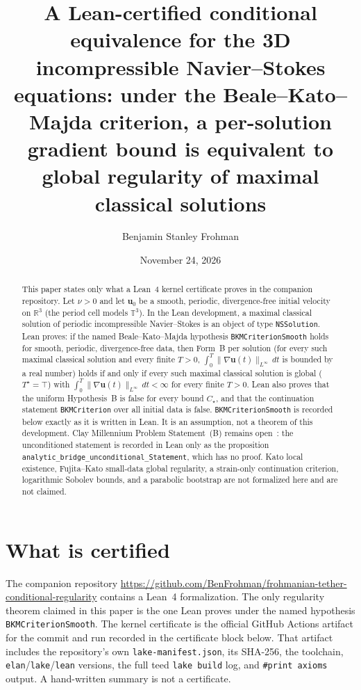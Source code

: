 \documentclass[11pt,reqno]{amsart}
\title[Lean-certified conditional equivalence for 3D Navier--Stokes]{A Lean-certified conditional equivalence for the 3D incompressible Navier--Stokes equations: under the Beale--Kato--Majda criterion, a per-solution gradient bound is equivalent to global regularity of maximal classical solutions}
\author{Benjamin Stanley Frohman}
\date{November 24, 2026}
\theoremstyle{definition}
\newcommand{\R}{\mathbb{R}}
\newcommand{\T}{\mathbb{T}}
\newcommand{\uvec}{\mathbf{u}}
\numberwithin{equation}{section}
\begin{document}
\begin{abstract}
This paper states only what a Lean~4 kernel certificate proves in the companion repository. Let \(\nu>0\) and let \(\uvec_0\) be a smooth, periodic, divergence-free initial velocity on \(\R^3\) (the period cell models \(\T^3\)). In the Lean development, a maximal classical solution of periodic incompressible Navier--Stokes is an object of type \texttt{NSSolution}. Lean proves: if the named Beale--Kato--Majda hypothesis \texttt{BKMCriterionSmooth} holds for smooth, periodic, divergence-free data, then Form~B per solution (for every such maximal classical solution and every finite \(T>0\), \(\int_0^T\|\nabla\uvec(t)\|_{L^\infty}\,dt\) is bounded by a real number) holds if and only if every such maximal classical solution is global (\(T^\star=\top\)) with \(\int_0^T\|\nabla\uvec(t)\|_{L^\infty}\,dt<\infty\) for every finite \(T>0\). Lean also proves that the uniform Hypothesis~B is false for every bound \(C_\star\), and that the continuation statement \texttt{BKMCriterion} over all initial data is false. \texttt{BKMCriterionSmooth} is recorded below exactly as it is written in Lean. It is an assumption, not a theorem of this development. Clay Millennium Problem Statement~(B) remains open~\cite{Fefferman2000}: the unconditioned statement is recorded in Lean only as the proposition \texttt{analytic\_bridge\_unconditional\_Statement}, which has no proof. Kato local existence, Fujita--Kato small-data global regularity, a strain-only continuation criterion, logarithmic Sobolev bounds, and a parabolic bootstrap are not formalized here and are not claimed.
\end{abstract}

\maketitle
{}\par\medskip

\section{What is certified}

The companion repository
\url{https://github.com/BenFrohman/frohmanian-tether-conditional-regularity}
contains a Lean~4 formalization. The only regularity theorem claimed in this paper is the one Lean proves under the named hypothesis \texttt{BKMCriterionSmooth}. The kernel certificate is the official GitHub Actions artifact for the commit and run recorded in the certificate block below. That artifact includes the repository's own \texttt{lake-manifest.json}, its SHA-256, the toolchain, \texttt{elan}/\texttt{lake}/\texttt{lean} versions, the full teed \texttt{lake build} log, and \texttt{\#print axioms} output. A hand-written summary is not a certificate.
\end{document}
